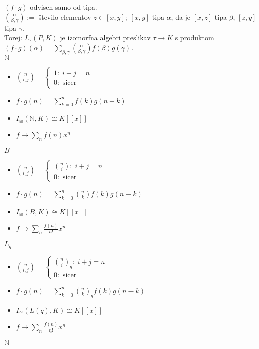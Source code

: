 \documentclass[a4paper, 12pt]{book}
\theoremstyle{definition}
\theoremstyle{remark}
\newcommand{\N}{\mathbb{N}}
\begin{document}
$(f \cdot g)$ odvisen samo od tipa. \\
$\binom{\alpha}{\beta, \gamma} :=$ število elementov $z \in [x,y]$; $[x,y]$ tipa $\alpha$,
da je $[x,z]$ tipa $\beta$, $[z,y]$ tipa $\gamma$. \\
Torej: $I_{\cong}(P, K)$ je izomorfna algebri preslikav $\tau \to K$ s produktom \\
$(f \cdot g)(\alpha) = \sum_{\beta, \gamma} \binom{\alpha}{\beta, \gamma} f(\beta) g(\gamma)$. \\
$\N$
\begin{itemize}[label={}]
  \item $\binom{n}{i, j} = \begin{cases}
      1: \; i+j=n \\
      0: \text{ sicer}
    \end{cases}$
  \item $f \cdot g(n) = \sum_{k=0}^n f(k) g(n-k)$
  \item $I_{\cong}(\N, K) \cong K[[x]]$
  \item $f \to \sum_n f(n) x^n$
\end{itemize}
$B$
\begin{itemize}[label={}]
  \item $\binom{n}{i, j} = \begin{cases}
      \binom{n}{i}: \; i+j=n \\
      0: \text{ sicer}
    \end{cases}$
  \item $f \cdot g(n) = \sum_{k=0}^n \binom{n}{k} f(k) g(n-k)$
  \item $I_{\cong}(B, K) \cong K[[x]]$
  \item $f \to \sum_n \frac{f(n)}{n!} x^n$
\end{itemize}
$L_q$
\begin{itemize}[label={}]
  \item $\binom{n}{i, j} = \begin{cases}
      \binom{n}{i}_q: \; i+j=n \\
      0: \text{ sicer}
    \end{cases}$
  \item $f \cdot g(n) = \sum_{k=0}^n \binom{n}{k}_q f(k) g(n-k)$
  \item $I_{\cong}(L(q), K) \cong K[[x]]$
  \item $f \to \sum_n \frac{f(n)}{\underline{n!}} x^n$
\end{itemize}
$\N$
\end{document}
